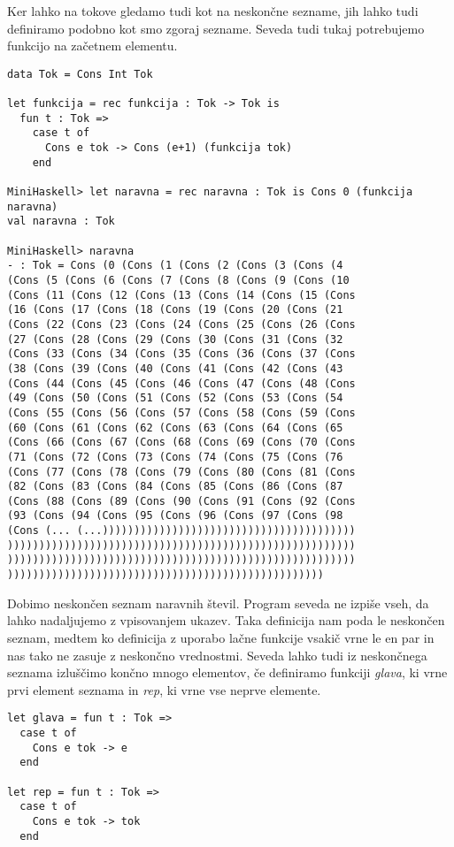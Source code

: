 \documentclass[12pt,a4paper,openany]{book}
\begin{document}
Ker lahko na tokove gledamo tudi kot na neskončne sezname, jih lahko tudi definiramo podobno kot smo zgoraj sezname. Seveda tudi tukaj 
potrebujemo funkcijo na začetnem elementu.
\begin{lstlisting}
data Tok = Cons Int Tok

let funkcija = rec funkcija : Tok -> Tok is
  fun t : Tok =>
    case t of
      Cons e tok -> Cons (e+1) (funkcija tok)
    end

MiniHaskell> let naravna = rec naravna : Tok is Cons 0 (funkcija naravna)
val naravna : Tok

MiniHaskell> naravna
- : Tok = Cons (0 (Cons (1 (Cons (2 (Cons (3 (Cons (4 
(Cons (5 (Cons (6 (Cons (7 (Cons (8 (Cons (9 (Cons (10 
(Cons (11 (Cons (12 (Cons (13 (Cons (14 (Cons (15 (Cons 
(16 (Cons (17 (Cons (18 (Cons (19 (Cons (20 (Cons (21 
(Cons (22 (Cons (23 (Cons (24 (Cons (25 (Cons (26 (Cons 
(27 (Cons (28 (Cons (29 (Cons (30 (Cons (31 (Cons (32 
(Cons (33 (Cons (34 (Cons (35 (Cons (36 (Cons (37 (Cons 
(38 (Cons (39 (Cons (40 (Cons (41 (Cons (42 (Cons (43 
(Cons (44 (Cons (45 (Cons (46 (Cons (47 (Cons (48 (Cons 
(49 (Cons (50 (Cons (51 (Cons (52 (Cons (53 (Cons (54 
(Cons (55 (Cons (56 (Cons (57 (Cons (58 (Cons (59 (Cons 
(60 (Cons (61 (Cons (62 (Cons (63 (Cons (64 (Cons (65 
(Cons (66 (Cons (67 (Cons (68 (Cons (69 (Cons (70 (Cons 
(71 (Cons (72 (Cons (73 (Cons (74 (Cons (75 (Cons (76 
(Cons (77 (Cons (78 (Cons (79 (Cons (80 (Cons (81 (Cons 
(82 (Cons (83 (Cons (84 (Cons (85 (Cons (86 (Cons (87 
(Cons (88 (Cons (89 (Cons (90 (Cons (91 (Cons (92 (Cons 
(93 (Cons (94 (Cons (95 (Cons (96 (Cons (97 (Cons (98 
(Cons (... (...))))))))))))))))))))))))))))))))))))))))
)))))))))))))))))))))))))))))))))))))))))))))))))))))))
)))))))))))))))))))))))))))))))))))))))))))))))))))))))
))))))))))))))))))))))))))))))))))))))))))))))))))
\end{lstlisting}
Dobimo neskončen seznam naravnih števil. Program seveda ne izpiše vseh, da lahko nadaljujemo z vpisovanjem ukazev. 
Taka definicija nam poda le neskončen seznam, medtem ko definicija z uporabo lačne funkcije vsakič vrne le en par 
in nas tako ne zasuje z neskončno vrednostmi. Seveda lahko tudi iz neskončnega seznama izluščimo končno mnogo 
elementov, če definiramo funkciji \emph{glava}, ki vrne prvi element seznama in \emph{rep}, ki vrne vse neprve elemente. 
\begin{lstlisting}
let glava = fun t : Tok =>
  case t of 
    Cons e tok -> e
  end

let rep = fun t : Tok =>
  case t of 
    Cons e tok -> tok
  end
\end{lstlisting}
\end{document}
